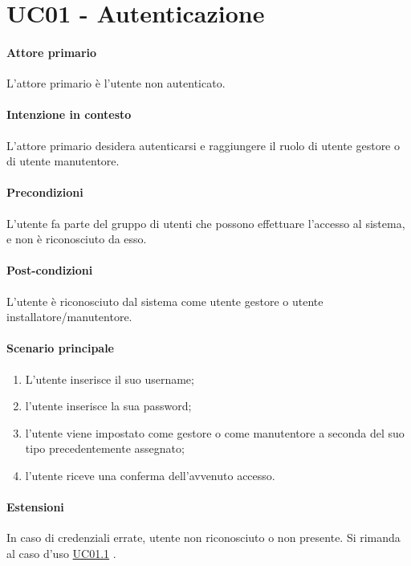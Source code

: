 \section{UC01 - Autenticazione}\label{uc:01}

\paragraph{Attore primario} L'attore primario è l'utente non autenticato.

\paragraph{Intenzione in contesto} L'attore primario desidera autenticarsi e raggiungere il ruolo di utente gestore o di utente manutentore.

\paragraph{Precondizioni} L'utente fa parte del gruppo di utenti che possono effettuare l'accesso al sistema, e non è riconosciuto da esso.

\paragraph{Post-condizioni} L'utente è riconosciuto dal sistema come utente gestore o utente installatore/manutentore.

\paragraph{Scenario principale}
\begin{enumerate}
    \item L'utente inserisce il suo username;
    \item l'utente inserisce la sua password;
    \item l'utente viene impostato come gestore o come manutentore a seconda del suo tipo precedentemente assegnato; 
    \item l'utente riceve una conferma dell'avvenuto accesso.
\end{enumerate}


\paragraph{Estensioni} In caso di credenziali errate, utente non riconosciuto o non presente. Si rimanda al caso d'uso \hyperref[uc:1.1]{UC01.1} .

